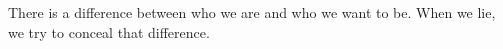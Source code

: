 There is a difference between who we are and who we want to be.
When we lie, we try to conceal that difference.
